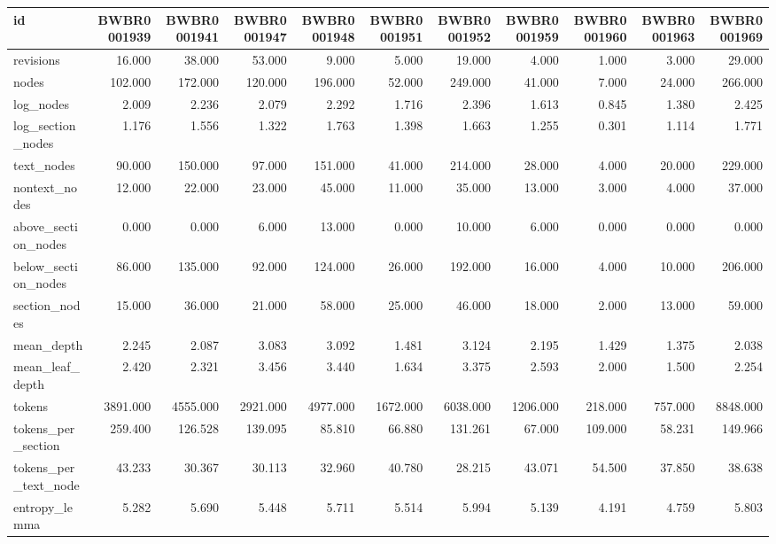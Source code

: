 \begin{tabular}{lrrrrrrrrrr}
\toprule
id & BWBR0001939 & BWBR0001941 & BWBR0001947 & BWBR0001948 & BWBR0001951 & BWBR0001952 & BWBR0001959 & BWBR0001960 & BWBR0001963 & BWBR0001969 \\
\midrule
revisions & 16.000 & 38.000 & 53.000 & 9.000 & 5.000 & 19.000 & 4.000 & 1.000 & 3.000 & 29.000 \\
\cline{1-11}
nodes & 102.000 & 172.000 & 120.000 & 196.000 & 52.000 & 249.000 & 41.000 & 7.000 & 24.000 & 266.000 \\
\cline{1-11}
log\_nodes & 2.009 & 2.236 & 2.079 & 2.292 & 1.716 & 2.396 & 1.613 & 0.845 & 1.380 & 2.425 \\
\cline{1-11}
log\_section\_nodes & 1.176 & 1.556 & 1.322 & 1.763 & 1.398 & 1.663 & 1.255 & 0.301 & 1.114 & 1.771 \\
\cline{1-11}
text\_nodes & 90.000 & 150.000 & 97.000 & 151.000 & 41.000 & 214.000 & 28.000 & 4.000 & 20.000 & 229.000 \\
\cline{1-11}
nontext\_nodes & 12.000 & 22.000 & 23.000 & 45.000 & 11.000 & 35.000 & 13.000 & 3.000 & 4.000 & 37.000 \\
\cline{1-11}
above\_section\_nodes & 0.000 & 0.000 & 6.000 & 13.000 & 0.000 & 10.000 & 6.000 & 0.000 & 0.000 & 0.000 \\
\cline{1-11}
below\_section\_nodes & 86.000 & 135.000 & 92.000 & 124.000 & 26.000 & 192.000 & 16.000 & 4.000 & 10.000 & 206.000 \\
\cline{1-11}
section\_nodes & 15.000 & 36.000 & 21.000 & 58.000 & 25.000 & 46.000 & 18.000 & 2.000 & 13.000 & 59.000 \\
\cline{1-11}
mean\_depth & 2.245 & 2.087 & 3.083 & 3.092 & 1.481 & 3.124 & 2.195 & 1.429 & 1.375 & 2.038 \\
\cline{1-11}
mean\_leaf\_depth & 2.420 & 2.321 & 3.456 & 3.440 & 1.634 & 3.375 & 2.593 & 2.000 & 1.500 & 2.254 \\
\cline{1-11}
tokens & 3891.000 & 4555.000 & 2921.000 & 4977.000 & 1672.000 & 6038.000 & 1206.000 & 218.000 & 757.000 & 8848.000 \\
\cline{1-11}
tokens\_per\_section & 259.400 & 126.528 & 139.095 & 85.810 & 66.880 & 131.261 & 67.000 & 109.000 & 58.231 & 149.966 \\
\cline{1-11}
tokens\_per\_text\_node & 43.233 & 30.367 & 30.113 & 32.960 & 40.780 & 28.215 & 43.071 & 54.500 & 37.850 & 38.638 \\
\cline{1-11}
entropy\_lemma & 5.282 & 5.690 & 5.448 & 5.711 & 5.514 & 5.994 & 5.139 & 4.191 & 4.759 & 5.803 \\

\end{tabular}
